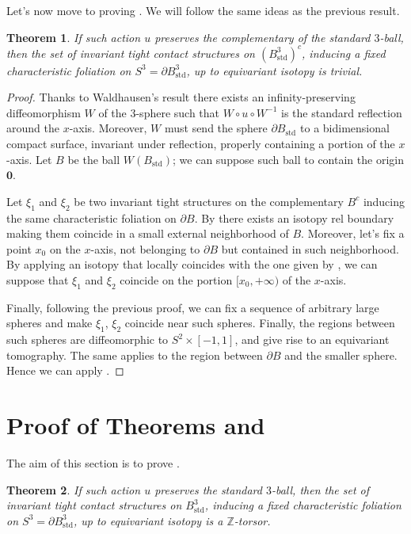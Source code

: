 \documentclass[a4paper, 11pt]{amsart}
\theoremstyle{plain}
\newtheorem{thmR}{Theorem}
\theoremstyle{definition}
\newcommand{\sd}{\text{std}}
\newcommand{\zero}{\mathbf{0}}
\newcommand{\Z}{\mathbb{Z}}
\begin{document}
Let's now move to proving . We will follow the same ideas as the previous result. 
\addtocounter{thmR}{-1}
\begin{thmR}
	If such action $u$ preserves the complementary of the standard $3$-ball, then the set of invariant tight contact structures on $(B^3_{\sd})^c$, inducing a fixed characteristic foliation on $S^3 = \partial B^3_{\sd}$, up to equivariant isotopy is trivial.
\end{thmR}
\begin{proof}
	Thanks to Waldhausen's result there exists an infinity-preserving diffeomorphism $W$ of the 3-sphere such that $W \circ u \circ W^{-1}$ is the standard reflection around the $x$-axis. Moreover, $W$ must send the sphere $\partial B_{\sd}$ to a bidimensional compact surface, invariant under reflection, properly containing a portion of the $x$-axis. Let $B$ be the ball $W(B_{\sd})$; we can suppose such ball to contain the origin $\zero$. 
	
	Let $\xi_1$ and $\xi_2$ be two invariant tight structures on the complementary $B^c$ inducing the same characteristic foliation on $\partial B$. By  there exists an isotopy rel boundary making them coincide in a small external neighborhood of $B$. Moreover, let's fix a point $x_0$ on the $x$-axis, not belonging to $\partial B$ but contained in such neighborhood. By applying an isotopy that locally coincides with the one given by , we can suppose that $\xi_1$ and $\xi_2$ coincide on the portion $[x_0, +\infty)$ of the $x$-axis. 
	
	Finally, following the previous proof, we can fix a sequence of arbitrary large spheres and make $\xi_1$, $\xi_2$ coincide near such spheres. Finally, the regions between such spheres are diffeomorphic to $S^2 \times [-1,1]$, and give rise to an equivariant tomography. The same applies to the region between $\partial B$ and the smaller sphere. Hence we can apply .
\end{proof}

\section{Proof of Theorems  and }\label{sec:proofmainthmclose}
The aim of this section is to prove .
\addtocounter{thmR}{-1}
\begin{thmR}
	If such action $u$ preserves the standard $3$-ball, then the set of invariant tight contact structures on $B^3_{\sd}$, inducing a fixed characteristic foliation on $S^3 = \partial B^3_{\sd}$, up to equivariant isotopy is a $\Z$-torsor.
\end{thmR}
\end{document}
